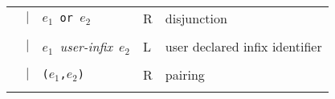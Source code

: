 \documentclass[11pt]{article}
\begin{document}
\begin{table}[p]
\begin{tabular}{|rcp{54mm}p{5mm}p{68mm}|}
    & $|$ &  $e_{1}${\tt\ or\ }$e_{2}$    &R & disjunction \\[-0.6em]
    &     &                              &  & \\
    & $|$ &  $e_{1}${\it\ user-infix\ }$e_{2}$
                                         &L & user declared infix identifier \\[-0.6em]
    &     &                              &  & \\
    & $|$ &  {\tt (}$e_{1}${\tt ,}$e_{2}${\tt )}     &R & pairing \\[-0.6em]
    &     &                            &  & \\

\end{tabular}
\end{table}
\end{document}
